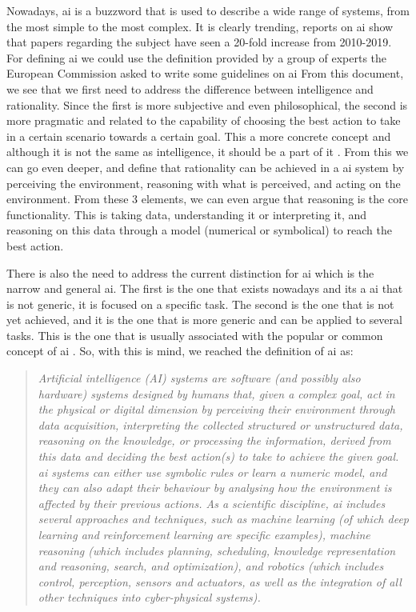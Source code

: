 Nowadays, \ac{ai} is a buzzword that is used to describe a wide range of systems, from the most simple to the most complex. It is clearly trending, reports on \ac{ai} show that papers regarding the subject have seen a 20-fold increase from 2010-2019.
For defining \ac{ai} we could use the definition provided by a group of experts the European Commission asked to write some guidelines on \ac{ai} \cite{DefinitionAIMain2019}
From this document, we see that we first need to address the difference between intelligence and rationality. Since the first is more subjective and even philosophical, the second is more pragmatic and related to the capability of choosing the best action to take in a certain scenario towards a certain goal. This a more concrete concept and although it is not the same as intelligence, it should be a part of it \cite{DefinitionAIMain2019,DBLP:books/aw/RN2020}.
From this we can go even deeper, and define that rationality can be achieved in a \ac{ai} system by perceiving the environment, reasoning with what is perceived, and acting on the environment. From these 3 elements, we can even argue that reasoning is the core functionality. This is taking data, understanding it or interpreting it, and reasoning on this data through a model (numerical or symbolical) to reach the best action.

There is also the need to address the current distinction for \ac{ai} which is the narrow and general \ac{ai}. The first is the one that exists nowadays and its a \ac{ai} that is not generic, it is focused on a specific task. The second is the one that is not yet achieved, and it is the one that is more generic and can be applied to several tasks. This is the one that is usually associated with the popular or common concept of \ac{ai} \cite{DefinitionAIMain2019,DBLP:books/aw/RN2020}. So, with this is mind, we reached the definition of \ac{ai} as:
\begin{quote}
    \textit{Artificial intelligence (AI) systems are software (and possibly also hardware) systems designed by humans that, given a complex goal, act in the physical or digital dimension by perceiving their environment through data acquisition, interpreting the collected structured or unstructured data, reasoning on the knowledge, or processing the information, derived from this data and deciding the best action(s) to take to achieve the given goal. \ac{ai} systems can either use symbolic rules or learn a numeric model, and they can also adapt their behaviour by analysing how the environment is affected by their previous actions. As a scientific discipline, \ac{ai} includes several approaches and techniques, such as machine learning (of which deep learning and reinforcement learning are specific examples), machine reasoning (which includes planning, scheduling, knowledge representation and reasoning, search, and optimization), and robotics (which includes control, perception, sensors and actuators, as well as the integration of all other techniques into cyber-physical systems).} \cite{DefinitionAIMain2019}
    \end{quote}


